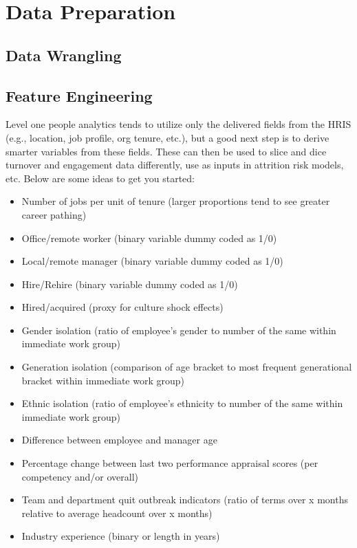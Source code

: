 \documentclass[]{book}
\providecommand{\tightlist}{%
  \setlength{\itemsep}{0pt}\setlength{\parskip}{0pt}}
\begin{document}
\hypertarget{data-prep}{%
\chapter{Data Preparation}\label{data-prep}}

\hypertarget{data-wrangling}{%
\section{Data Wrangling}\label{data-wrangling}}

\hypertarget{feature-engineering}{%
\section{Feature Engineering}\label{feature-engineering}}

Level one people analytics tends to utilize only the delivered fields from the HRIS (e.g., location, job profile, org tenure, etc.), but a good next step is to derive smarter variables from these fields. These can then be used to slice and dice turnover and engagement data differently, use as inputs in attrition risk models, etc. Below are some ideas to get you started:

\begin{itemize}
\tightlist
\item
  Number of jobs per unit of tenure (larger proportions tend to see greater career pathing)
\item
  Office/remote worker (binary variable dummy coded as 1/0)
\item
  Local/remote manager (binary variable dummy coded as 1/0)
\item
  Hire/Rehire (binary variable dummy coded as 1/0)
\item
  Hired/acquired (proxy for culture shock effects)
\item
  Gender isolation (ratio of employee's gender to number of the same within immediate work
  group)
\item
  Generation isolation (comparison of age bracket to most frequent generational bracket within
  immediate work group)
\item
  Ethnic isolation (ratio of employee's ethnicity to number of the same within immediate work
  group)
\item
  Difference between employee and manager age
\item
  Percentage change between last two performance appraisal scores (per competency and/or
  overall)
\item
  Team and department quit outbreak indicators (ratio of terms over x months relative to average
  headcount over x months)
\item
  Industry experience (binary or length in years)
\end{itemize}
\end{document}
